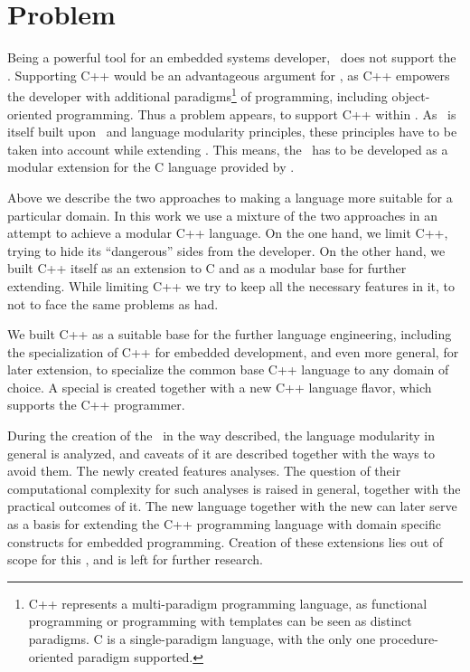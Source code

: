\section{Problem}

Being a powerful tool for an embedded systems developer, \mbdr\ does not support the \cpppl. Supporting C++ would be an
advantageous argument for \mbdr, as C++ empowers the developer with additional paradigms\footnote{C++ represents 
a multi-paradigm programming language, as functional programming or programming with templates can be seen as 
distinct paradigms. C is a single-paradigm language, with the only one procedure-oriented paradigm supported.}
of programming, including 
object-oriented programming. Thus a problem appears, to support C++ within \mbdr. As \mbdr\ is itself built upon
\jbmps\ and language modularity principles, these principles have to be taken into account while extending \mbdr.
This means, the \cpppl\ has to be developed as a modular extension for the C language provided by \mbdr.




Above we describe the two approaches to making a language more suitable for a particular domain. In this work we use a mixture of 
the two approaches in an  attempt to achieve a modular C++ language. On the one hand, we limit C++, trying to hide its ``dangerous'' sides 
from the developer. On the other hand, we built C++ itself as an extension to C and as a modular base for further extending. While limiting 
C++ we try to keep all the necessary features in it, to not to face the same problems as  had.

We built C++ as a suitable base for the further language engineering, including the specialization  of C++ for embedded development, 
and even more general, for later extension, to specialize the common base C++ language to any domain of choice. A special  is created 
together with a new C++ language flavor, which supports the C++ programmer.

During the creation of the \cpppl\ in the way described, the language modularity in general is analyzed, and caveats of it
are described together with the ways to avoid them. The newly created  features analyses. The question of their computational complexity for such analyses 
is raised in general, together with the practical outcomes of it. The new language together with the new  can later serve as a basis for extending the C++ programming 
language with domain specific constructs for embedded programming. Creation of these extensions lies out of scope
for this \MT, and is left for further research.


